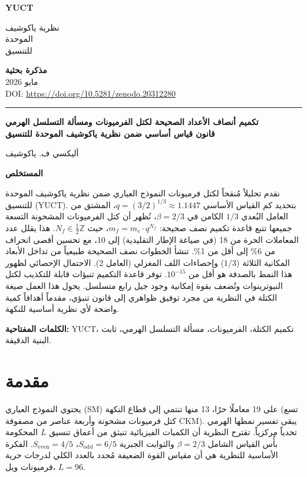 \documentclass[12pt,a4paper]{article}
\newcommand{\makeheader}{%
	\noindent
	\begin{minipage}{0.17\textwidth}
		\raggedright
		{\sffamily\bfseries\color{skyblue}\fontsize{40}{40}\selectfont YUCT}%
	\end{minipage}%
	\hspace{30pt}
	\begin{minipage}{0.32\textwidth}
		\raggedright
		{\sffamily\fontsize{11}{13}\selectfont نظرية ياكوشيف\\ الموحدة\\ للتنسيق}%
	\end{minipage}%
	\hfill
	\begin{minipage}{0.38\textwidth}
		\raggedleft
		{\sffamily\bfseries مذكرة بحثية}\\
		{\sffamily مايو 2026}\\
		{\sffamily\footnotesize DOI: \scriptsize\url{https://doi.org/10.5281/zenodo.20312280}}%
	\end{minipage}
	\par\vspace{5pt}
	\noindent\textcolor{gold}{\rule{\textwidth}{1.6pt}}
	\par\vspace{0pt}
}
\begin{document}
	\thispagestyle{firstpage}
	\makeheader
	
	\vspace{0cm}
	{\LARGE\bfseries تكميم أنصاف الأعداد الصحيحة لكتل الفرميونات ومسألة التسلسل الهرمي \\ 
		\Large قانون قياس أساسي ضمن نظرية ياكوشيف الموحدة للتنسيق \par}
	\vspace{0.2cm}
	
	{\large أليكسي ف. ياكوشيف} \\
	\vspace{0.0cm}
	
	{\color{darkblue}\textbf{\LARGE المستخلص}} \par
	{\large
		\noindent
		نقدم تحليلاً مُنقحاً لكتل فرميونات النموذج العياري ضمن نظرية ياكوشيف الموحدة للتنسيق (YUCT). بتحديد كم القياس الأساسي \(q = (3/2)^{1/3} \approx 1.1447\)، المشتق من العامل البُعدي \(1/3\) الكامن في \(\beta = 2/3\)، نُظهر أن كتل الفرميونات المشحونة التسعة جميعها تتبع قاعدة تكميم نصف صحيحة: \(m_f = m_e \cdot q^{N_f}\)، حيث \(N_f \in \frac{1}{2}\mathbb{Z}\). هذا يقلل عدد المعاملات الحرة من 18 (في صياغة الإطار التقليدية) إلى 10، مع تحسين أقصى انحراف من 6\% إلى أقل من 1\%. تنشأ الخطوات نصف الصحيحة طبيعياً من تداخل الأبعاد المكانية الثلاثة (\(1/3\)) وإحصاءات اللف المغزلي (العامل 2). الاحتمال الإحصائي لظهور هذا النمط بالصدفة هو أقل من \(10^{-15}\). توفر قاعدة التكميم تنبؤات قابلة للتكذيب لكتل النيوترينوات وتُضعف بقوة إمكانية وجود جيل رابع متسلسل. يحول هذا العمل صيغة الكتلة في النظرية من مجرد توفيق ظواهري إلى قانون تنبؤي، مقدماً أهدافاً كمية واضحة لأي نظرية أساسية للنكهة.
	}
	
	\vspace{0.1cm}
	\noindent
	{\color{darkblue}\textbf{الكلمات المفتاحية:}} YUCT، تكميم الكتلة، الفرميونات، مسألة التسلسل الهرمي، ثابت البنية الدقيقة.
	
	\vspace{0.4cm}
	
	\section{مقدمة}
	يحتوي النموذج العياري (SM) على 19 معاملًا حرًا، 13 منها تنتمي إلى قطاع النكهة (تسع كتل فرميونات مشحونة وأربعة عناصر من مصفوفة CKM). يبقى تفسير نمطها الهرمي تحدياً مركزياً. تقترح النظرية أن الكميات الفيزيائية تنبثق من أعماق تنسيق \(L\) المحكومة بأُس القياس الشامل \(\beta = 2/3\) والثوابت الجبرية \(S_{\mathrm{odd}}=6/5\)، \(S_{\mathrm{even}}=4/5\). الفكرة الأساسية للنظرية هي أن مقياس القوة الضعيفة مُحدد بالعدد الكلي لدرجات حرية فرميونات ويل، \(L=96\).
	
\end{document}
